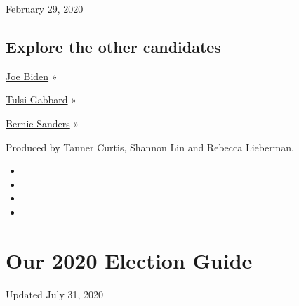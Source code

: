 February 29, 2020

\hypertarget{explore-the-other-candidates}{%
\subsection{Explore the other
candidates}\label{explore-the-other-candidates}}

\href{https://www.nytimes.com/interactive/2020/us/elections/joe-biden.html}{Joe
Biden} »

\href{https://www.nytimes.com/interactive/2020/us/elections/tulsi-gabbard.html}{Tulsi
Gabbard} »

\href{https://www.nytimes.com/interactive/2020/us/elections/bernie-sanders.html}{Bernie
Sanders} »

Produced by Tanner Curtis, Shannon Lin and Rebecca Lieberman.

\begin{itemize}
\item
\item
\item
\item
\end{itemize}

\hypertarget{our-2020-election-guide}{%
\section{Our 2020 Election Guide}\label{our-2020-election-guide}}

Updated July 31, 2020

